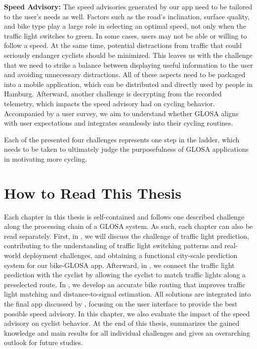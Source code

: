 \textbf{\color{cidarkblue}Speed Advisory:} The speed advisories generated by our app need to be tailored to the user's needs as well. Factors such as the road's inclination, surface quality, and bike type play a large role in selecting an optimal speed, not only when the traffic light switches to green. In some cases, users may not be able or willing to follow a speed. At the same time, potential distractions from traffic that could seriously endanger cyclists should be minimized. This leaves us with the challenge that we need to strike a balance between displaying useful information to the user and avoiding unnecessary distractions. All of these aspects need to be packaged into a mobile application, which can be distributed and directly used by people in Hamburg. Afterward, another challenge is decrypting from the recorded telemetry, which impacts the speed advisory had on cycling behavior. Accompanied by a user survey, we aim to understand whether GLOSA aligns with user expectations and integrates seamlessly into their cycling routines.

Each of the presented four challenges represents one step in the ladder, which needs to be taken to ultimately judge the purposefulness of GLOSA applications in motivating more cycling.

\section{How to Read This Thesis}

Each chapter in this thesis is self-contained and follows one described challenge along the processing chain of a GLOSA system. As such, each chapter can also be read separately. First, in , we will discuss the challenge of traffic light prediction, contributing to the understanding of traffic light switching patterns and real-world deployment challenges, and obtaining a functional city-scale prediction system for our bike-GLOSA app. Afterward, in , we connect the traffic light prediction with the cyclist by allowing the cyclist to match traffic lights along a preselected route. In , we develop an accurate bike routing that improves traffic light matching and distance-to-signal estimation. All solutions are integrated into the final app discussed by , focusing on the user interface to provide the best possible speed advisory. In this chapter, we also evaluate the impact of the speed advisory on cyclist behavior. At the end of this thesis,  summarizes the gained knowledge and main results for all individual challenges and gives an overarching outlook for future studies.

